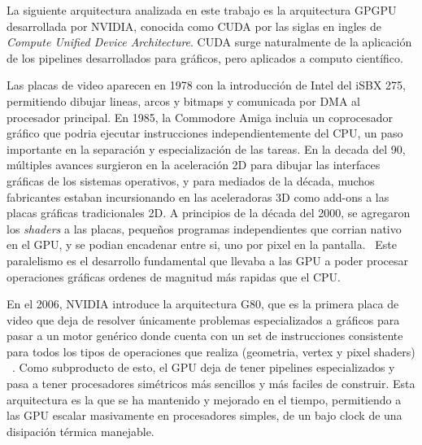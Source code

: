 La siguiente arquitectura analizada en este trabajo es la arquitectura GPGPU desarrollada por NVIDIA, conocida
como CUDA por las siglas en ingles de \textit{Compute Unified Device Architecture}.
CUDA surge naturalmente de la aplicaci\'on de los pipelines desarrollados para
gr\'aficos, pero aplicados a computo cient\'ifico.

Las placas de video aparecen en 1978 con la introducci\'on de Intel del iSBX 275, permitiendo dibujar lineas,
arcos y bitmaps y comunicada por DMA al procesador principal. En 1985, la Commodore Amiga incluia un coprocesador
gr\'afico que podria ejecutar instrucciones independientemente del CPU, un paso importante en la separaci\'on
y especializaci\'on de las tareas. En la decada del 90, m\'ultiples
avances surgieron en la aceleraci\'on 2D para dibujar las interfaces gr\'aficas de los sistemas operativos,
y para mediados de la d\'ecada, muchos fabricantes estaban incursionando en las aceleradoras 3D como
add-ons a las placas gr\'aficas tradicionales 2D. A principios de la d\'ecada del 2000, se agregaron los
\textit{shaders} a las placas, peque\~nos programas independientes que corrian nativo en el GPU,
y se podian encadenar entre si, uno por pixel en la pantalla.~\cite{CG} Este paralelismo es el desarrollo fundamental
que llevaba a las GPU a poder procesar operaciones gr\'aficas ordenes de magnitud m\'as rapidas que el CPU.

En el 2006, NVIDIA introduce la arquitectura G80,
que es la primera placa de video que deja de resolver \'unicamente problemas especializados a gr\'aficos
para pasar a un motor gen\'erico donde cuenta con un set de instrucciones consistente para todos los
tipos de operaciones que realiza (geometria, vertex y pixel shaders) ~\cite{cudaHandbook}. Como subproducto de esto,
el GPU deja de tener pipelines especializados y pasa a tener procesadores sim\'etricos m\'as sencillos y m\'as
faciles de construir. Esta arquitectura es la que se ha mantenido y mejorado en el tiempo, permitiendo
a las GPU escalar masivamente en procesadores simples, de un bajo clock de una disipaci\'on t\'ermica
manejable.

